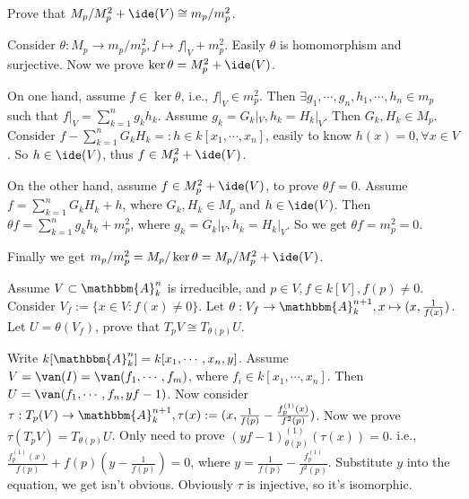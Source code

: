 \documentclass{ctexart}
\begin{document}
\begin{problem}
  Prove that \(M_p/M_p^2+\ide(V) \cong m_p/m_p^2\).
\end{problem}
\begin{solution}
  Consider \(\theta : M_p \to m_p/m_p^2, f \mapsto f|_V+m_p^2\). Easily \(\theta\) is homomorphism and surjective.
  Now we prove \(\ker \theta = M_p^2+\ide(V)\).

  On one hand, assume \(f \in \ker \theta\), i.e., \(f|_V \in m_p^2\).
  Then \(\exists g_1,\cdots,g_n,h_1,\cdots,h_n \in m_p\) such that \(f|_V=\sum_{k=1}^{n} g_k h_k\).
  Assume \(g_k=G_k|_V,h_k=H_k|_V\). Then \(G_k,H_k \in M_p\).
  Consider \(f-\sum_{k=1}^{n} G_k H_k=:h \in k[x_1,\cdots,x_n]\), easily to know \(h(x)=0,\forall x \in V\).
  So \(h \in \ide(V)\), thus \(f \in M_p^2+\ide(V)\).

  On the other hand, assume \(f \in M_p^2+\ide(V)\), to prove \(\theta f =0\).
  Assume \(f=\sum_{k=1}^{n} G_k H_k+h\), where \(G_k,H_k \in M_p\) and \(h \in \ide(V)\).
  Then \(\theta f = \sum_{k=1}^{n} g_k h_k +m_p^2\), where \(g_k=G_k|_V,h_k=H_k|_V\).
  So we get \(\theta f = m_p^2=0\).

  Finally we get \(m_p/m_p^{2} = M_p/ \ker \theta = M_p / M_p^2+\ide(V)\).
\end{solution}
\begin{problem}\label{pro:1}
  Assume \(V \subset \mathbbm{A}_k^n\) is irreducible, and \(p \in V,f \in k[V], f(p)\neq 0\).
  Consider \(V_f:= \{x \in V: f(x)\neq 0 \}\). Let \(\theta: V_f \to \mathbbm{A}_k^{n+1},x \mapsto (x,\frac{1}{f(x)})\).
  Let \(U = \theta(V_f)\), prove that \(T_p V \cong T_{\theta(p)} U\).
\end{problem}
\begin{solution}
  Write \(k[\mathbbm{A}_k^n]=k[x_1,\cdots , x_n ,y]\). Assume \(V = \van(I)= \van(f_1,\cdots, f_m)\), where \(f_i \in k[x_1,\cdots,x_n ]\).
  Then \(U = \van(f_1,\cdots,f_n, yf-1)\). Now consider \(\tau: T_p(V) \to \mathbbm{A}_k^{n+1}, \tau(x):=(x,\frac{1}{f(p)}-\frac{f_p^{(1)}(x)}{f^2(p)})\).
  Now we prove \(\tau(T_p V)=T_{\theta(p)} U\).
  Only need to prove \((yf-1)_{\theta(p)}^{(1)}(\tau(x))=0\).
  i.e., \(\frac{f_p^{(1)}(x)}{f(p)}+f(p)(y-\frac{1}{f(p)})=0\), where \(y = \frac{1}{f(p)}-\frac{f_p^{(1)}}{f^2(p)}\).
  Substitute \(y\) into the equation, we get isn't obvious.
  Obviously \(\tau\) is injective, so it's isomorphic.
\end{solution}
\end{document}
